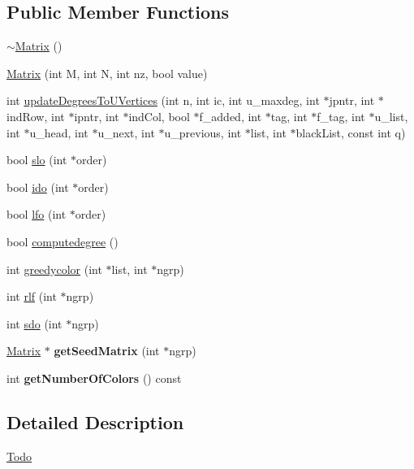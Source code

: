 \subsection*{Public Member Functions}
\begin{DoxyCompactItemize}
\item 
\hyperlink{classMatrix_a9b1c3627f573d78a2f08623fdfef990f}{$\sim$Matrix} ()
\item 
\hyperlink{classMatrix_ae1ee0790f74689ac1ea9d6493e5ccd60}{Matrix} (int M, int N, int nz, bool value)
\item 
int \hyperlink{classMatrix_a7c1221aa40beeb82fdbacddcf86d58c9}{updateDegreesToUVertices} (int n, int ic, int u\_\-maxdeg, int $\ast$jpntr, int $\ast$indRow, int $\ast$ipntr, int $\ast$indCol, bool $\ast$f\_\-added, int $\ast$tag, int $\ast$f\_\-tag, int $\ast$u\_\-list, int $\ast$u\_\-head, int $\ast$u\_\-next, int $\ast$u\_\-previous, int $\ast$list, int $\ast$blackList, const int q)
\item 
bool \hyperlink{classMatrix_ac7e287f032e1296c51ce29704a0af704}{slo} (int $\ast$order)
\item 
bool \hyperlink{classMatrix_ab9bef57c1115e601cdeb493ecb381b82}{ido} (int $\ast$order)
\item 
bool \hyperlink{classMatrix_a24f9f912233b249ba1bb8e18eb979121}{lfo} (int $\ast$order)
\item 
bool \hyperlink{classMatrix_a6f6be59bfe0d4d5e1efae38f22174482}{computedegree} ()
\item 
int \hyperlink{classMatrix_a7ecfea6224fd953efa4a2add29307d0a}{greedycolor} (int $\ast$list, int $\ast$ngrp)
\item 
int \hyperlink{classMatrix_a55f7c0c85880d58823dd77aeefbd046c}{rlf} (int $\ast$ngrp)
\item 
int \hyperlink{classMatrix_a52e013055a3aef16751672815fc06600}{sdo} (int $\ast$ngrp)
\item 
\hypertarget{classMatrix_adbd4897b49ac42163ff50884a43499dc}{
\hyperlink{classMatrix}{Matrix} $\ast$ {\bfseries getSeedMatrix} (int $\ast$ngrp)}
\label{classMatrix_adbd4897b49ac42163ff50884a43499dc}

\item 
\hypertarget{classMatrix_aaa650ab5e57f0e1be15756184425794f}{
int {\bfseries getNumberOfColors} () const }
\label{classMatrix_aaa650ab5e57f0e1be15756184425794f}

\end{DoxyCompactItemize}


\subsection{Detailed Description}
\begin{Desc}
\item[\hyperlink{todo__todo000002}{Todo}]\end{Desc}


